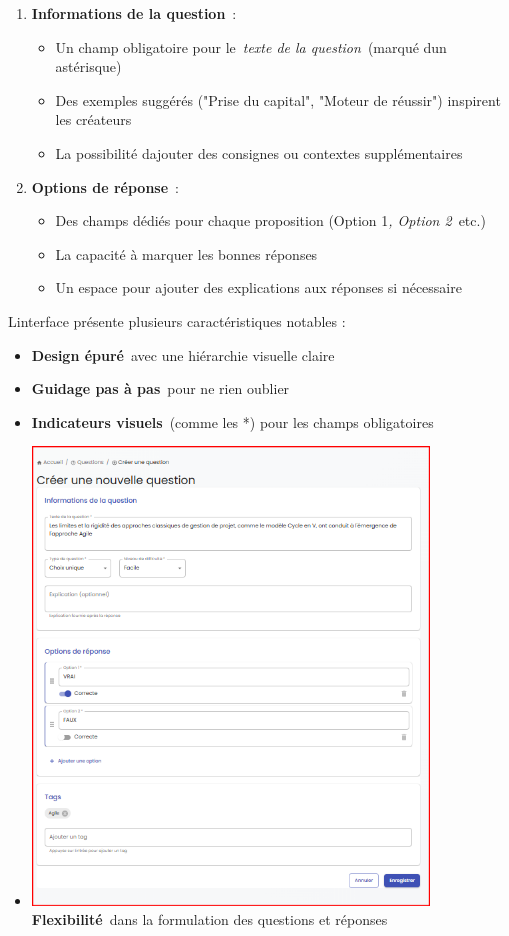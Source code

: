 \documentclass[12pt,a4paper,twoside]{report}
\begin{document}
\begin{enumerate}
\def\labelenumi{\arabic{enumi}.}
\item
  \textbf{Informations de la question}~:

  \begin{itemize}
  \item
    Un champ obligatoire pour le~\emph{texte de la question}~(marqué
    d\textquotesingle un astérisque)
  \item
    Des exemples suggérés ("Prise du capital", "Moteur de réussir")
    inspirent les créateurs
  \item
    La possibilité d\textquotesingle ajouter des consignes ou contextes
    supplémentaires
  \end{itemize}
\item
  \textbf{Options de réponse}~:

  \begin{itemize}
  \item
    Des champs dédiés pour chaque proposition (Option 1\emph{, Option
    2}~etc.)
  \item
    La capacité à marquer les bonnes réponses
  \item
    Un espace pour ajouter des explications aux réponses si nécessaire
  \end{itemize}
\end{enumerate}

L\textquotesingle interface présente plusieurs caractéristiques notables
:

\begin{itemize}
\item
  \textbf{Design épuré}~avec une hiérarchie visuelle claire
\item
  \textbf{Guidage pas à pas}~pour ne rien oublier
\item
  \textbf{Indicateurs visuels}~(comme les *) pour les champs
  obligatoires
\item
  \includegraphics[width=4.15299in,height=4.78497in]{latex_media/media/image55.png}\textbf{Flexibilité}~dans
  la formulation des questions et réponses
\end{itemize}
\end{document}
